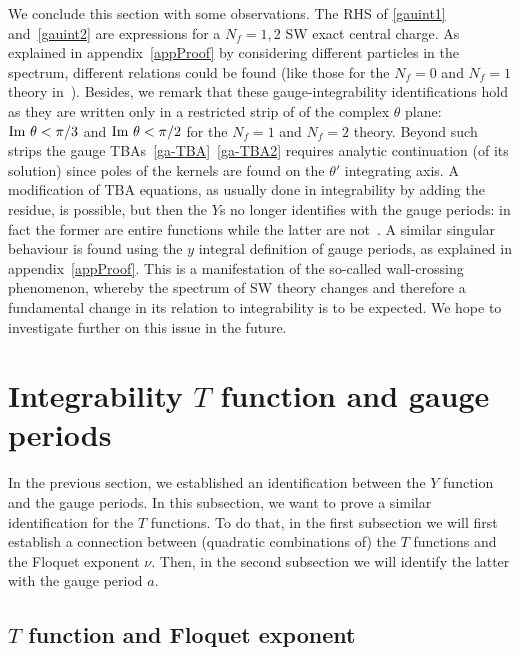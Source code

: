 \documentclass[11pt,a4paper]{elsarticle}
\def \th {\theta}
\def\Im{{\rm Im ~}}
\def\th{\theta}
\numberwithin{figure}{section}
\numberwithin{table}{section}
\begin{document}
We conclude this section with some observations. The RHS of \eqref{gauint1} and~\eqref{gauint2} are expressions for a $N_f=1,2$ SW exact central charge. As explained in appendix~\ref{appProof} by considering different particles in the spectrum, different relations could be found (like those for the $N_f=0$ and $N_f=1$ theory in~\cite{GrassiGuMarino,GrassiHaoNeitzke:2021}). Besides, we remark that these gauge-integrability identifications hold as they are written only in a restricted strip of of the complex $\th$ plane: $\Im \th<\pi/3$ and $\Im \th < \pi/2 $ for the $N_f=1$ and $N_f=2$ theory. Beyond such strips the gauge TBAs~\eqref{ga-TBA}~\eqref{ga-TBA2} requires analytic continuation (of its solution) since poles of the kernels are found on the $\th'$ integrating axis. A modification of TBA equations, as usually done in integrability by adding the residue, is possible, but then the $Y$s no longer identifies with the gauge periods: in fact the former are entire functions while the latter are not~\cite{Fioravanti-DDV-1996,DestriDeVega:1997,CecottiDelZotto:2014,ItoMarinoShu:2018}. A similar singular behaviour is found using the $y$ integral definition of gauge periods, as explained in appendix~\ref{appProof}. This is a manifestation of the so-called wall-crossing phenomenon, whereby the spectrum of SW theory changes and therefore a fundamental change in its relation to integrability is to be expected. We hope to investigate further on this issue in the future.



\section{Integrability $T$ function and gauge periods} \label{secT}

In the previous section, we established an identification between the $Y$ function and the gauge periods. In this subsection, we want to prove a similar identification for the $T$ functions. To do that, in the first subsection we will first establish a connection between (quadratic combinations of) the $T$ functions and the Floquet exponent $\nu$. Then, in the second subsection we will identify the latter with the gauge period $a$.

\subsection{$T$ function and Floquet exponent}
\end{document}
